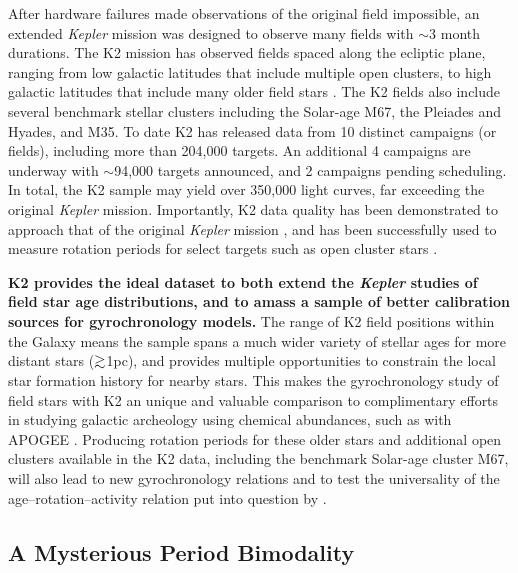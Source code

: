 \documentclass[12pt]{article}
\newcommand{\Kepler}{\textsl{Kepler}\xspace}
\def\gtrsim{\mathrel{\hbox{\rlap{\hbox{\lower3pt\hbox{$\sim$}}}\hbox{\raise2pt\hbox{$>$}}}}}
\begin{document}
After hardware failures made observations of the original field impossible, an extended \Kepler mission was designed to observe many fields with $\sim$3 month durations. The K2 mission has observed fields spaced along the ecliptic plane, ranging from low galactic latitudes that include multiple open clusters, to high galactic latitudes that include many older field stars \citep{howell2014}. The K2 fields also include several benchmark stellar clusters including the Solar-age M67, the Pleiades and Hyades, and M35. To date K2 has released data from 10 distinct campaigns (or fields), including more than 204,000 targets. An additional 4 campaigns are underway with $\sim$94,000 targets announced, and 2 campaigns pending scheduling. In total, the K2 sample may yield over 350,000 light curves, far exceeding the original \Kepler mission. Importantly, K2 data quality has been demonstrated to approach that of the original \Kepler mission \citep{luger2016}, and has been successfully used to measure rotation periods for select targets such as open cluster stars \citep[e.g.][]{douglas2017}.


\clearpage %
{\bf K2 provides the ideal dataset to both extend the \Kepler studies of field star age distributions, and to amass a sample of better calibration sources for gyrochronology models.} The range of K2 field positions within the Galaxy means the sample spans a much wider variety of stellar ages for more distant stars ($\gtrsim$1pc), and provides multiple opportunities to constrain the local star formation history for nearby stars. This makes the gyrochronology study of field stars with K2 an unique and valuable comparison to complimentary efforts in studying galactic archeology using chemical abundances, such as with APOGEE \citep{hayden2014}.
Producing rotation periods for these older stars and additional open clusters available in the K2 data, including the benchmark Solar-age cluster M67, will also lead to new gyrochronology relations and to test the universality of the age--rotation--activity relation put into question by \citet{angus2015}.



\subsection{A Mysterious Period Bimodality}
\end{document}
